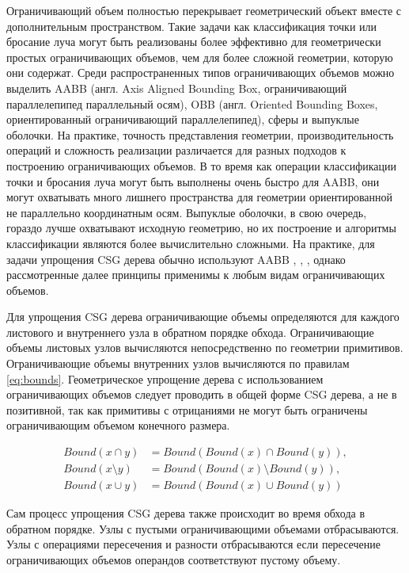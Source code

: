 Ограничивающий объем полностью перекрывает геометрический объект вместе с дополнительным пространством. Такие задачи как классификация точки или бросание луча могут быть реализованы более эффективно для геометрически простых ограничивающих объемов, чем для более сложной геометрии, которую они содержат. Среди распространенных типов ограничивающих объемов можно выделить AABB (англ. Axis Aligned Bounding Box, ограничивающий параллелепипед параллельный осям), OBB (англ. Oriented Bounding Boxes, ориентированный ограничивающий параллелепипед), сферы и выпуклые оболочки. На практике, точность представления геометрии, производительность операций и сложность реализации различается для разных подходов к построению ограничивающих объемов. В то время как операции классификации точки и бросания луча могут быть выполнены очень быстро для AABB, они могут охватывать много лишнего пространства для геометрии ориентированной не параллельно координатным осям. Выпуклые оболочки, в свою очередь, гораздо лучше охватывают исходную геометрию, но их построение и алгоритмы классификации являются более вычислительно сложными. На практике, для задачи упрощения CSG дерева обычно используют AABB \cite{bouatouch1987new}, \cite{goldfeather1989near}, \cite{wiegand1996interactive}, однако рассмотренные далее принципы применимы к любым видам ограничивающих объемов.

Для упрощения CSG дерева ограничивающие объемы определяются для каждого листового и внутреннего узла в обратном порядке обхода. Ограничивающие объемы листовых узлов вычисляются непосредственно по геометрии примитивов. Ограничивающие объемы внутренних узлов вычисляются по правилам \ref{eq:bounds}. Геометрическое упрощение дерева с использованием ограничивающих объемов следует проводить в общей форме CSG дерева, а не в позитивной, так как примитивы с отрицаниями не могут быть ограничены ограничивающим объемом конечного размера. 

\begin{equation}
  \label{eq:bounds}
  \begin{alignedat}{2}
    Bound(x \cap y) & = Bound(Bound(x) \cap Bound(y)), \\
    Bound(x \setminus y) & = Bound(Bound(x) \setminus Bound(y)), \\
    Bound(x \cup y) & = Bound(Bound(x) \cup Bound(y))
  \end{alignedat}
\end{equation}

Сам процесс упрощения CSG дерева также происходит во время обхода в обратном порядке. Узлы с пустыми ограничивающими объемами отбрасываются. Узлы с операциями пересечения и разности отбрасываются если пересечение ограничивающих объемов операндов соответствуют пустому объему.

